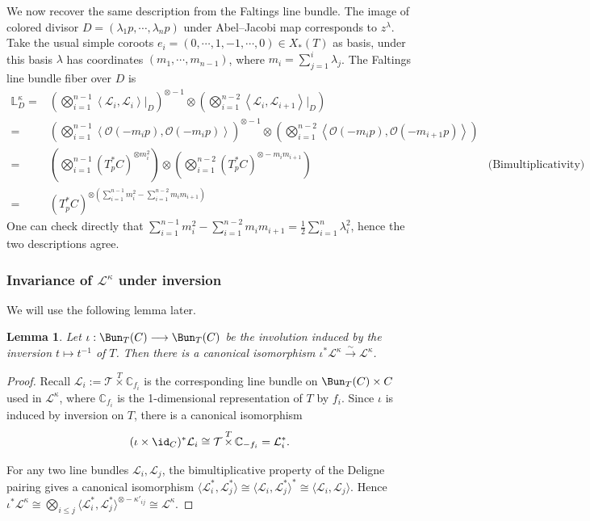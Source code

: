 \documentclass{amsart}
\numberwithin{equation}{section}
\numberwithin{figure}{section}
\newtheorem{lem}[thm]{Lemma}
\theoremstyle{definition}
\theoremstyle{remark}
\renewcommand{\c}[1]{\mathcal{#1}}
\renewcommand{\b}[1]{\mathbb{#1}}
\begin{document}
	We now recover the same description from the Faltings line bundle.
	The image of colored divisor $D=(\lambda_1p,\cdots, \lambda_np)$ under Abel--Jacobi map corresponds to $z^\lambda$. 
	Take the usual simple coroots $e_i=(0,\cdots, 1,-1,\cdots,0)\in X_*(T)$ as basis, under this basis $\lambda$ has coordinates $(m_1,\cdots, m_{n-1})$, where $m_i=\sum_{j=1}^{i}\lambda_j$.
	The Faltings line bundle fiber over $D$ is
	\begin{align*}
		\b L^\kappa_D=&\left(\bigotimes_{i=1}^{n-1}\left\langle \c L_i,\c L_i\right\rangle |_D\right)^{\otimes -1}
		\otimes \left(\bigotimes_{i=1}^{n-2}\left\langle \c L_i,\c L_{i+1}\right\rangle|_D \right)\\
		=&\left(\bigotimes_{i=1}^{n-1}\left\langle \c O(-m_ip),\c O(-m_ip)\right\rangle \right)^{\otimes -1}
		\otimes \left(\bigotimes_{i=1}^{n-2}\left\langle \c O(-m_ip),\c O(-m_{i+1}p)\right\rangle \right)\\
		=&\left(\bigotimes_{i=1}^{n-1} (T_p^*C)^{\otimes m_i^2} \right)
		\otimes \left(\bigotimes_{i=1}^{n-2}(T_p^*C)^{\otimes -m_im_{i+1}}  \right) &\text{(Bimultiplicativity)}\\
		=& (T_p^*C)^{\otimes \left(\sum_{i=1}^{n-1}m_i^2- \sum_{i=1}^{n-2}m_im_{i+1}\right) }
	\end{align*}
	One can check directly that $\sum_{i=1}^{n-1}m_i^2- \sum_{i=1}^{n-2}m_im_{i+1}=\frac{1}{2}\sum_{i=1}^n \lambda_i^2$, hence the two descriptions agree.

\subsubsection{Invariance of $\c L^\kappa$ under inversion}
We will use the following lemma later.
\begin{lem}\label{dual}
	Let $\iota:\Bun_T(C)\longrightarrow\Bun_T(C)$
	be the involution induced by the inversion 
	\(t\mapsto t^{-1}\) of \(T\). Then there is a canonical isomorphism $\iota^*\c L^\kappa\xrightarrow{\sim}\c L^\kappa$.

	
\end{lem}

\begin{proof}
	Recall $\c L_i:=\c T\mathop{\times}\limits^T\mathbb C_{f_i}$ is the corresponding line bundle on \(\Bun_T(C)\times C\) used in $\c L^\kappa$, where $\b C_{f_i}$ is the 1-dimensional representation of $T$ by $f_i$.	Since \(\iota\) is induced by inversion on \(T\), there is a	canonical isomorphism
	\[(\iota\times\id_C)^*\c L_i\cong \c T\mathop{\times}\limits^T\mathbb C_{-f_i}= \c L_i^*.\]
	
	For any two line bundles \(\c L_i,\c L_j\), the
	bimultiplicative property of the Deligne pairing gives a canonical 	isomorphism
	$\langle\c L_i^*,\c L_j^*\rangle	\cong
\langle\c L_i,\c L_j^*\rangle^*\cong
\langle\c L_i,\c L_j\rangle.$ Hence $\iota^*\c L^\kappa\cong \bigotimes_{ i\le j}\langle\c L_i^*,\c L_j^*\rangle^{\otimes-\kappa'_{ij}}\cong \c L^\kappa$.
\end{proof}
\end{document}
